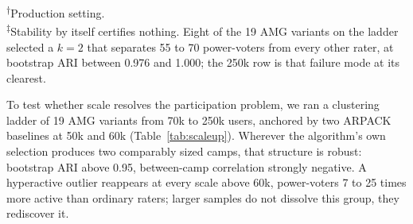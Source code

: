 \documentclass[10pt,twocolumn]{article}
\begin{document}
\begin{table}[t]
\centering
\small
{}
\caption{Clustering stability across scale. Initial columns: the partition selected on the raw co-rating graph before reassignment, $k$ chosen by bootstrap stability, ARI the mean bootstrap ARI at that $k$. Method B columns: the final two-camp partition after vote-profile reassignment, on notes with at least ten raters per camp. Pearson correlates the camps' note-level approval rates; Discrim.\ is the share of notes whose between-camp gap exceeds 0.3. The last column gives the separated sub-population and its median vote count relative to the main camps.}
\label{tab:scaleup}
\begin{flushleft}
\footnotesize
\textsuperscript{$\dagger$}Production setting.\\
\textsuperscript{$\ddagger$}Stability by itself certifies nothing. Eight of the 19 AMG variants on the ladder selected a $k=2$ that separates 55 to 70 power-voters from every other rater, at bootstrap ARI between 0.976 and 1.000; the 250k row is that failure mode at its clearest.
\end{flushleft}
\end{table}

To test whether scale resolves the participation problem, we ran a clustering ladder of 19 AMG variants from 70k to 250k users, anchored by two ARPACK baselines at 50k and 60k (Table~\ref{tab:scaleup}). Wherever the algorithm's own selection produces two comparably sized camps, that structure is robust: bootstrap ARI above 0.95, between-camp correlation strongly negative. A hyperactive outlier reappears at every scale above 60k, power-voters 7 to 25 times more active than ordinary raters; larger samples do not dissolve this group, they rediscover it.
\end{document}
